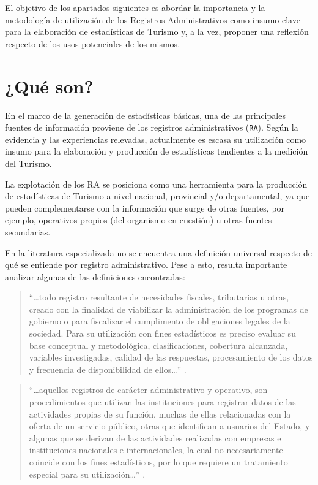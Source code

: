 \documentclass[
]{book}
\begin{document}
El objetivo de los apartados siguientes es abordar la importancia y la metodología de utilización de los Registros Administrativos como insumo clave para la elaboración de estadísticas de Turismo y, a la vez, proponer una reflexión respecto de los usos potenciales de los mismos.

\hypertarget{quuxe9-son}{%
\section{¿Qué son?}\label{quuxe9-son}}

En el marco de la generación de estadísticas básicas, una de las principales fuentes de información proviene de los registros administrativos (\texttt{RA}). Según la evidencia y las experiencias relevadas, actualmente es escasa su utilización como insumo para la elaboración y producción de estadísticas tendientes a la medición del Turismo.

La explotación de los RA se posiciona como una herramienta para la producción de estadísticas de Turismo a nivel nacional, provincial y/o departamental, ya que pueden complementarse con la información que surge de otras fuentes, por ejemplo, operativos propios (del organismo en cuestión) u otras fuentes secundarias.

En la literatura especializada no se encuentra una definición universal respecto de qué se entiende por registro administrativo. Pese a esto, resulta importante analizar algunas de las definiciones encontradas:

\begin{quote}
``\ldots todo registro resultante de necesidades fiscales, tributarias u otras, creado con la finalidad de viabilizar la administración de los programas de gobierno o para fiscalizar el cumplimento de obligaciones legales de la sociedad. Para su utilización con fines estadísticos es preciso evaluar su base conceptual y metodológica, clasificaciones, cobertura alcanzada, variables investigadas, calidad de las respuestas, procesamiento de los datos y frecuencia de disponibilidad de ellos\ldots{}'' \citep{cepal2003}.
\end{quote}

\begin{quote}
``\ldots aquellos registros de carácter administrativo y operativo, son procedimientos que utilizan las instituciones para registrar datos de las actividades propias de su función, muchas de ellas relacionadas con la oferta de un servicio público, otras que identifican a usuarios del Estado, y algunas que se derivan de las actividades realizadas con empresas e instituciones nacionales e internacionales, la cual no necesariamente coincide con los fines estadísticos, por lo que requiere un tratamiento especial para su utilización\ldots{}'' \citep{inei2004}.
\end{quote}
\end{document}
